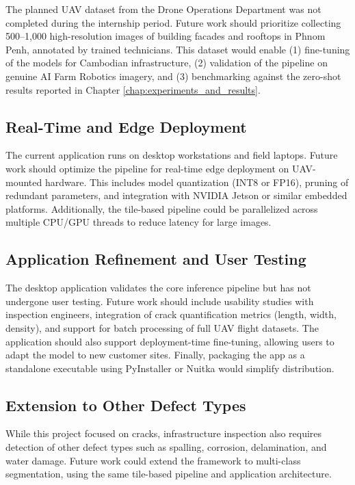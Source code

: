 \hs The planned UAV dataset from the Drone Operations Department was not completed during the internship period. Future work should prioritize collecting 500--1,000 high-resolution images of building facades and rooftops in Phnom Penh, annotated by trained technicians. This dataset would enable (1) fine-tuning of the models for Cambodian infrastructure, (2) validation of the pipeline on genuine AI Farm Robotics imagery, and (3) benchmarking against the zero-shot results reported in Chapter \ref{chap:experiments_and_results}.

\subsection{Real-Time and Edge Deployment}

\hs The current application runs on desktop workstations and field laptops. Future work should optimize the pipeline for real-time edge deployment on UAV-mounted hardware. This includes model quantization (INT8 or FP16), pruning of redundant parameters, and integration with NVIDIA Jetson or similar embedded platforms. Additionally, the tile-based pipeline could be parallelized across multiple CPU/GPU threads to reduce latency for large images.

\subsection{Application Refinement and User Testing}

\hs The desktop application validates the core inference pipeline but has not undergone user testing. Future work should include usability studies with inspection engineers, integration of crack quantification metrics (length, width, density), and support for batch processing of full UAV flight datasets. The application should also support deployment-time fine-tuning, allowing users to adapt the model to new customer sites. Finally, packaging the app as a standalone executable using PyInstaller or Nuitka would simplify distribution.

\subsection{Extension to Other Defect Types}

\hs While this project focused on cracks, infrastructure inspection also requires detection of other defect types such as spalling, corrosion, delamination, and water damage. Future work could extend the framework to multi-class segmentation, using the same tile-based pipeline and application architecture.